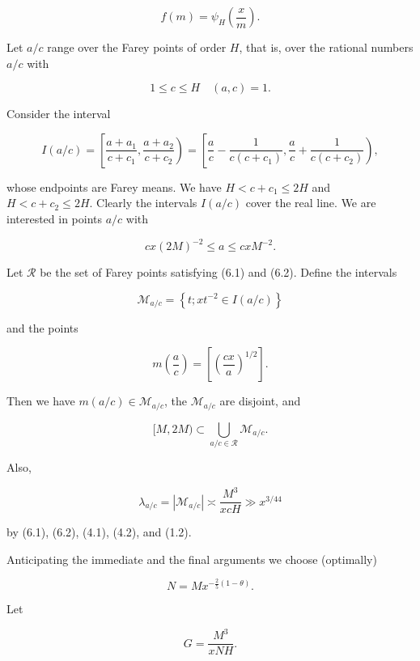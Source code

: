 \documentclass[10pt]{article}
\begin{document}
$$
f(m)=\psi_{H}\left(\frac{x}{m}\right) .
$$

Let $a/c$ range over the Farey points of order $H$, that is, over the rational numbers $a/c$ with


\begin{equation*}
1 \leqslant c \leqslant H \quad(a, c)=1 . \tag{6.1}
\end{equation*}


Consider the interval

$$
I(a / c)=\left[\frac{a+a_{1}}{c+c_{1}}, \frac{a+a_{2}}{c+c_{2}}\right)=\left[\frac{a}{c}-\frac{1}{c\left(c+c_{1}\right)}, \frac{a}{c}+\frac{1}{c\left(c+c_{2}\right)}\right),
$$

whose endpoints are Farey means. We have $H<c+c_{1} \leqslant 2 H$ and $H<c+c_{2} \leqslant 2 H$. Clearly the intervals $I(a / c)$ cover the real line. We are interested in points $a / c$ with


\begin{equation*}
cx(2M)^{-2}\leqslant a\leqslant cxM^{-2} . \tag{6.2}
\end{equation*}


Let $\mathscr{R}$ be the set of Farey points satisfying (6.1) and (6.2).
Define the intervals

$$
\mathscr{M}_{a / c}=\left\{t ; x t^{-2} \in I(a / c)\right\}
$$

and the points

$$
m\left(\frac{a}{c}\right)=\left[\left(\frac{c x}{a}\right)^{1 / 2}\right] .
$$

Then we have $m(a / c) \in \mathscr{M}_{a / c}$, the $\mathscr{M}_{a / c}$ are disjoint, and

$$
[M, 2 M) \subset \bigcup_{a / c \in \mathscr{R}} \mathscr{M}_{a / c} .
$$

Also,


\begin{equation*}
\lambda_{a / c}=\left|\mathscr{M}_{a / c}\right| \asymp \frac{M^{3}}{x c H} \gg x^{3 / 44} \tag{6.3}
\end{equation*}


by (6.1), (6.2), (4.1), (4.2), and (1.2).

Anticipating the immediate and the final arguments we choose (optimally)


\begin{equation*}
N=M x^{-\frac{2}{5}(1-\theta)} . \tag{6.4}
\end{equation*}


Let


\begin{equation*}
G=\frac{M^{3}}{x N H} . \tag{6.5}
\end{equation*}
\end{document}
